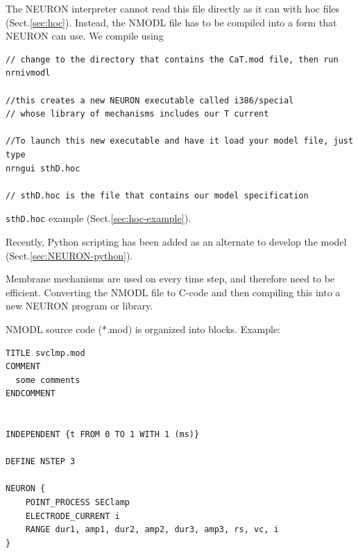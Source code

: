 The NEURON interpreter cannot read this file directly
as it can with hoc files (Sect.\ref{sec:hoc}). Instead, the NMODL file has to be
compiled into a form that NEURON can use.
We compile using
\begin{verbatim}
// change to the directory that contains the CaT.mod file, then run
nrnivmodl

//this creates a new NEURON executable called i386/special
// whose library of mechanisms includes our T current

//To launch this new executable and have it load your model file, just type
nrngui sthD.hoc 

// sthD.hoc is the file that contains our model specification
\end{verbatim}
\verb!sthD.hoc! example (Sect.\ref{sec:hoc-example}).

Recently, Python scripting has been added as an alternate to develop the model
(Sect.\ref{sec:NEURON-python}).

\begin{mdframed}
Membrane mechanisms are used on every time step, and therefore need to be
efficient. Converting the NMODL file to C-code and then compiling this into a
new NEURON program or library.
\end{mdframed}

NMODL source code (*.mod) is organized into blocks.
Example:
\begin{verbatim}
TITLE svclmp.mod
COMMENT
  some comments
ENDCOMMENT


INDEPENDENT {t FROM 0 TO 1 WITH 1 (ms)}

DEFINE NSTEP 3

NEURON {
	POINT_PROCESS SEClamp
	ELECTRODE_CURRENT i
	RANGE dur1, amp1, dur2, amp2, dur3, amp3, rs, vc, i
}

\end{verbatim}



